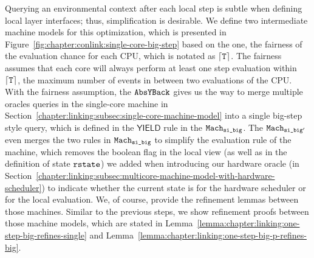 Querying an environmental context after each local step is subtle when defining local layer interfaces;
thus, simplification is desirable. 
We define two intermediate machine models for this optimization,
which is presented in Figure~\ref{fig:chapter:conlink:single-core-big-step} based on the one, the fairness of the evaluation chance for each CPU, which is notated as ${\lceil{{\mathrm{\texttt{T}}}}\rceil}$. 
The fairness assumes that each core will always perform at least one step evaluation within 
${\lceil{{\mathrm{\texttt{T}}}}\rceil}$,  the maximum number
of events in between two evaluations of the CPU.
With the fairness assumption, 
the ${{\mathrm{\texttt{AbsYBack}}}}$ gives us the way to merge multiple oracles queries in
the single-core machine in Section~\ref{chapter:linking:subsec:single-core-machine-model} 
into a single big-step style query,
which is defined in the $\textsf{YIELD}$ rule in the ${{{\mathrm{\texttt{Mach}}}}_{{\mathrm{\texttt{si\_big}}}}}$.
The ${{{\mathrm{\texttt{Mach}}}}_{{\mathrm{\texttt{si\_big}}}'}}$ even merges the two rules in  ${{{\mathrm{\texttt{Mach}}}}_{{\mathrm{\texttt{si\_big}}}}}$ to simplify 
the evaluation rule of the machine, which removes the boolean flag in the local view (as well as in  the definition of state ${{\mathrm{\texttt{rstate}}}}$) 
we added when introducing our hardware oracle (in Section~\ref{chapter:linking:subsec:multicore-machine-model-with-hardware-scheduler}) to indicate whether the current state is for the hardware scheduler or for the local evaluation.
We, of course, provide the refinement lemmas between those machines.
Similar to the previous steps, 
we show refinement proofs between those machine models,
which are stated in Lemma~\ref{lemma:chapter:linking:one-step-big-refines-single} and Lemma~\ref{lemma:chapter:linking:one-step-big-p-refines-big}.
%
%
%

